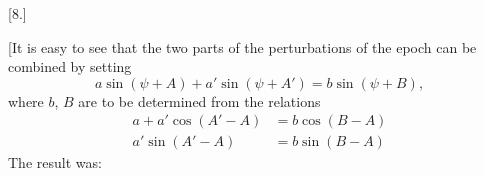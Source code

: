 \begingroup
{}
\renewcommand{\headrulewidth}{0pt}
\par\medskip
{}
\begin{center}[8.]\end{center}
\par\noindent\hspace*{\parindent}[It is easy to see that the two parts of the perturbations of the epoch can be combined by setting
\[
a\sin(\psi+A)+a'\sin(\psi+A')=b\sin(\psi+B),
\]
where \(b\), \(B\) are to be determined from the relations
\[
\begin{aligned}
a+a'\cos(A'-A)&=b\cos(B-A)\\
a'\sin(A'-A)&=b\sin(B-A)
\end{aligned}
\]
The result was:
\par
{}
\begingroup\small
